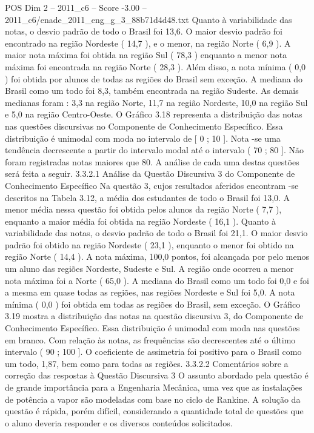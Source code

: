 \begin{textsample}{POS Dim 2 – 2011\_c6 – Score -3.00 – 2011\_c6/enade\_2011\_eng\_g\_3\_88b71d4d48.txt}
Quanto à variabilidade das notas, o desvio padrão de todo o Brasil foi 13,6.
O maior desvio padrão foi encontrado na região Nordeste ( 14,7 ), e o menor, na região Norte ( 6,9 ).
A maior nota máxima foi obtida na região Sul ( 78,3 ) enquanto a menor nota máxima foi encontrada na região Norte ( 28,3 ).
Além disso, a nota mínima ( 0,0 ) foi obtida por alunos de todas as regiões do Brasil sem exceção.
A mediana do Brasil como um todo foi 8,3, também encontrada na região Sudeste.
As demais medianas foram : 3,3 na região Norte, 11,7 na região Nordeste, 10,0 na região Sul e 5,0 na região Centro-Oeste.
O Gráfico 3.18 representa a distribuição das notas nas questões discursivas no Componente de Conhecimento Específico.
Essa distribuição é unimodal com moda no intervalo de [ 0 ; 10 ].
Nota -se uma tendência decrescente a partir do intervalo modal até o intervalo ( 70 ; 80 ].
Não foram registradas notas maiores que 80.
A análise de cada uma destas questões será feita a seguir. 3.3.2.1 Análise da Questão Discursiva 3 do Componente de Conhecimento Específico Na questão 3, cujos resultados aferidos encontram -se descritos na Tabela 3.12, a média dos estudantes de todo o Brasil foi 13,0.
A menor média nessa questão foi obtida pelos alunos da região Norte ( 7,7 ), enquanto a maior média foi obtida na região Nordeste ( 16,1 ).
Quanto à variabilidade das notas, o desvio padrão de todo o Brasil foi 21,1.
O maior desvio padrão foi obtido na região Nordeste ( 23,1 ), enquanto o menor foi obtido na região Norte ( 14,4 ).
A nota máxima, 100,0 pontos, foi alcançada por pelo menos um aluno das regiões Nordeste, Sudeste e Sul.
A região onde ocorreu a menor nota máxima foi a Norte ( 65,0 ).
A mediana do Brasil como um todo foi 0,0 e foi a mesma em quase todas as regiões, nas regiões Nordeste e Sul foi 5,0.
A nota mínima ( 0,0 ) foi obtida em todas as regiões do Brasil, sem exceção.
O Gráfico 3.19 mostra a distribuição das notas na questão discursiva 3, do Componente de Conhecimento Específico.
Essa distribuição é unimodal com moda nas questões em branco.
Com relação às notas, as frequências são decrescentes até o último intervalo ( 90 ; 100 ].
O coeficiente de assimetria foi positivo para o Brasil como um todo, 1,87, bem como para todas as regiões. 3.3.2.2 Comentários sobre a correção das respostas à Questão Discursiva 3 O assunto abordado pela questão é de grande importância para a Engenharia Mecânica, uma vez que as instalações de potência a vapor são modeladas com base no ciclo de Rankine.
A solução da questão é rápida, porém difícil, considerando a quantidade total de questões que o aluno deveria responder e os diversos conteúdos solicitados.

\end{textsample}
